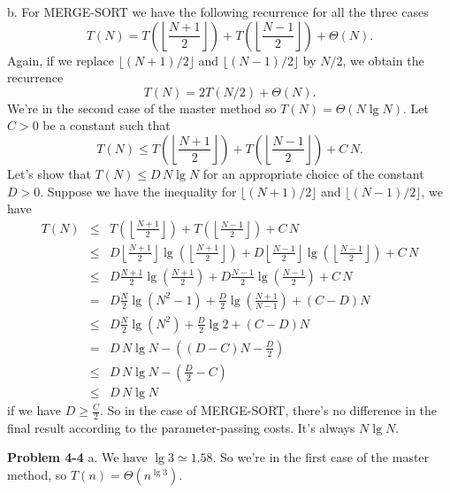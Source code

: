\documentclass[a4paper,12pt]{article}
\newcommand{\newprob}[1]
{\bigskip \noindent \textbf{Problem #1} \newline}
\newcommand{\subpar}[1]{\medskip \noindent #1.}
\begin{document}
\subpar{b}  For \textmd{MERGE-SORT} we have the following recurrence
for all the three cases
\[ T(N) = T\left(\left\lfloor\frac{N+1}{2}\right\rfloor\right) +
T\left(\left\lfloor\frac{N-1}{2}\right\rfloor\right) + \Theta(N).\]
Again, if we replace $\lfloor (N+1)/2\rfloor$ and $\lfloor
(N-1)/2\rfloor$ by $N/2$, we obtain the recurrence
\[ T(N) = 2T(N/2) + \Theta(N).\]
We're in the second case of the master method so $T(N) = \Theta(N\lg
N)$.  Let $C > 0$ be a constant such that
\[ T(N) \le T\left(\left\lfloor\frac{N+1}{2}\right\rfloor\right) +
T\left(\left\lfloor\frac{N-1}{2}\right\rfloor\right) + C\,N.\] Let's
show that $T(N) \le D\,N\lg N$ for an appropriate choice of the
constant $D > 0$.  Suppose we have the inequality for $\lfloor
(N+1)/2\rfloor$ and $\lfloor (N-1)/2\rfloor$, we have
\begin{eqnarray*}
  T(N) &\le& T\left(\left\lfloor\frac{N+1}{2}\right\rfloor\right) +
  T\left(\left\lfloor\frac{N-1}{2}\right\rfloor\right) + C\,N \\
  &\le& D\left\lfloor\frac{N+1}{2}\right\rfloor
  \lg\left(\left\lfloor\frac{N+1}{2}\right\rfloor\right) + 
  D\left\lfloor\frac{N-1}{2}\right\rfloor
  \lg\left(\left\lfloor\frac{N-1}{2}\right\rfloor\right) + C\,N \\
  &\le&  D\frac{N+1}{2}
  \lg\left(\frac{N+1}{2}\right) + 
  D\frac{N-1}{2}
  \lg\left(\frac{N-1}{2}\right) + C\,N \\
  &=& D\frac{N}{2}\lg(N^2 - 1)+
  \frac{D}{2} \lg\left(\frac{N+1}{N-1}\right) +
  (C - D) N \\
  &\le& D \frac{N}{2} \lg(N^2) + \frac{D}{2} \lg 2 + (C - D) N \\
  &=& D\,N\lg N - \left((D - C) N - \frac{D}{2}\right) \\
  &\le& D\,N\lg N - \left(\frac{D}{2} - C\right) \\
  &\le& D\,N\lg N
\end{eqnarray*}
if we have $D \ge \frac{C}{2}$.  So in the case of
\textmd{MERGE-SORT}, there's no difference in the final result
according to the parameter-passing costs.  It's always $N\lg N$.

\newprob{4-4}
\subpar{a} We have $\lg 3 \simeq 1.58$.  So we're in the first case of
the master method, so $T(n) = \Theta(n^{\lg 3})$.
\end{document}
